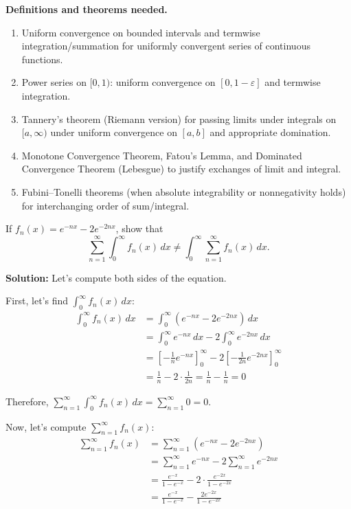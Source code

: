\noindent\textbf{Definitions and theorems needed.}
\begin{enumerate}[label=(\alph*)]
    \item Uniform convergence on bounded intervals and termwise integration/summation for uniformly convergent series of continuous functions.
    \item Power series on $[0,1)$: uniform convergence on $[0,1-\varepsilon]$ and termwise integration.
    \item Tannery's theorem (Riemann version) for passing limits under integrals on $[a,\infty)$ under uniform convergence on $[a,b]$ and appropriate domination.
    \item Monotone Convergence Theorem, Fatou's Lemma, and Dominated Convergence Theorem (Lebesgue) to justify exchanges of limit and integral.
    \item Fubini–Tonelli theorems (when absolute integrability or nonnegativity holds) for interchanging order of sum/integral.
\end{enumerate}



\begin{problembox}
If $f_n(x) = e^{-nx} - 2e^{-2nx}$, show that 
\[\sum_{n=1}^{\infty} \int_{0}^{\infty} f_n(x) \, dx \neq \int_{0}^{\infty} \sum_{n=1}^{\infty} f_n(x) \, dx.\]
\end{problembox}

\noindent\textbf{Solution:}
Let's compute both sides of the equation.

First, let's find $\int_{0}^{\infty} f_n(x) \, dx$:
\begin{align*}
\int_{0}^{\infty} f_n(x) \, dx &= \int_{0}^{\infty} (e^{-nx} - 2e^{-2nx}) \, dx \\
&= \int_{0}^{\infty} e^{-nx} \, dx - 2\int_{0}^{\infty} e^{-2nx} \, dx \\
&= \left[-\frac{1}{n}e^{-nx}\right]_{0}^{\infty} - 2\left[-\frac{1}{2n}e^{-2nx}\right]_{0}^{\infty} \\
&= \frac{1}{n} - 2 \cdot \frac{1}{2n} = \frac{1}{n} - \frac{1}{n} = 0
\end{align*}

Therefore, $\sum_{n=1}^{\infty} \int_{0}^{\infty} f_n(x) \, dx = \sum_{n=1}^{\infty} 0 = 0$.

Now, let's compute $\sum_{n=1}^{\infty} f_n(x)$:
\begin{align*}
\sum_{n=1}^{\infty} f_n(x) &= \sum_{n=1}^{\infty} (e^{-nx} - 2e^{-2nx}) \\
&= \sum_{n=1}^{\infty} e^{-nx} - 2\sum_{n=1}^{\infty} e^{-2nx} \\
&= \frac{e^{-x}}{1 - e^{-x}} - 2 \cdot \frac{e^{-2x}}{1 - e^{-2x}} \\
&= \frac{e^{-x}}{1 - e^{-x}} - \frac{2e^{-2x}}{1 - e^{-2x}}
\end{align*}

